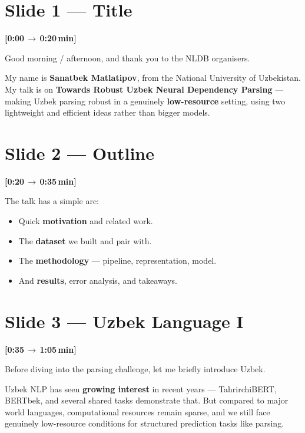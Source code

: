 \documentclass[12pt,a4paper]{article}
\newcommand{\timing}[2]{%
   \par\noindent\textbf{\small [#1\,$\to$\,#2\,min]}\par\vspace{0.2em}}
\newcommand{\say}[1]{\textbf{#1}}
\begin{document}
\newpage

\section*{Slide 1 --- Title}
\timing{0:00}{0:20}

Good morning / afternoon, and thank you to the NLDB organisers.

My name is \say{Sanatbek Matlatipov}, from the National University of
Uzbekistan. My talk is on \say{Towards Robust Uzbek Neural Dependency
Parsing} --- making Uzbek parsing robust in a genuinely
\say{low-resource} setting, using two lightweight and efficient ideas
rather than bigger models.

\section*{Slide 2 --- Outline}
\timing{0:20}{0:35}

The talk has a simple arc:

\begin{itemize}
   \item Quick \textbf{motivation} and related work.
   \item The \textbf{dataset} we built and pair with.
   \item The \textbf{methodology} --- pipeline, representation, model.
   \item And \textbf{results}, error analysis, and takeaways.
\end{itemize}

\section*{Slide 3 --- Uzbek Language I}
\timing{0:35}{1:05}

Before diving into the parsing challenge, let me briefly introduce Uzbek.

Uzbek NLP has seen \say{growing interest} in recent years ---
TahrirchiBERT, BERTbek, and several shared tasks demonstrate that.
But compared to major world languages, computational resources remain
sparse, and we still face genuinely low-resource conditions for
structured prediction tasks like parsing.
\end{document}
